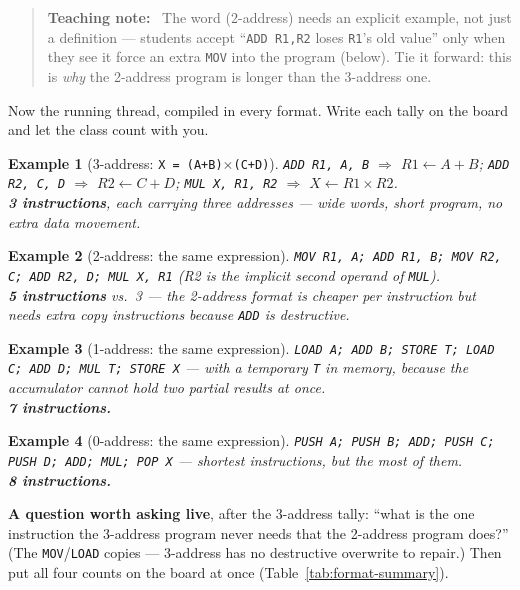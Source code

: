 \documentclass[11pt]{article}
\newtheorem{example}{Example}[section]
\newenvironment{teachingaside}{\begin{quote}\small\color{primary-gold}\textbf{Teaching note:}\ }{\end{quote}}
\begin{document}
\begin{teachingaside}
The word  (2-address) needs an explicit example, not just a definition --- students accept ``\texttt{ADD R1,R2} loses \texttt{R1}'s old value'' only when they see it force an extra \texttt{MOV} into the program (below). Tie it forward: this is \emph{why} the 2-address program is longer than the 3-address one.
\end{teachingaside}

Now the running thread, compiled in every format. Write each tally on the board and let the class count with you.

\begin{example}[3-address: \texttt{X = (A+B)$\times$(C+D)}]
\texttt{ADD R1, A, B} $\Rightarrow$ $R1 \gets A+B$; \quad \texttt{ADD R2, C, D} $\Rightarrow$ $R2 \gets C+D$; \quad \texttt{MUL X, R1, R2} $\Rightarrow$ $X \gets R1 \times R2$.\\
\textbf{3 instructions}, each carrying three addresses --- wide words, short program, no extra data movement.
\end{example}

\begin{example}[2-address: the same expression]
\texttt{MOV R1, A; ADD R1, B; MOV R2, C; ADD R2, D; MUL X, R1} (R2 is the implicit second operand of \texttt{MUL}).\\
\textbf{5 instructions} vs.\ 3 --- the 2-address format is cheaper per instruction but needs extra copy instructions because \texttt{ADD} is destructive.
\end{example}

\begin{example}[1-address: the same expression]
\texttt{LOAD A; ADD B; STORE T; LOAD C; ADD D; MUL T; STORE X} --- with a temporary \texttt{T} in memory, because the accumulator cannot hold two partial results at once.\\
\textbf{7 instructions.}
\end{example}

\begin{example}[0-address: the same expression]
\texttt{PUSH A; PUSH B; ADD; PUSH C; PUSH D; ADD; MUL; POP X} --- shortest instructions, but the most of them.\\
\textbf{8 instructions.}
\end{example}

\textbf{A question worth asking live}, after the 3-address tally: ``what is the one instruction the 3-address program never needs that the 2-address program does?'' (The \texttt{MOV}/\texttt{LOAD} copies --- 3-address has no destructive overwrite to repair.) Then put all four counts on the board at once (Table~\ref{tab:format-summary}).
\end{document}
